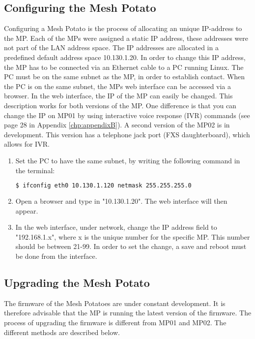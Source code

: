 \subsection{Configuring the Mesh Potato}
\label{subsec:configuring}
Configuring a Mesh Potato is the process of allocating an unique IP-address to the MP. Each of the MPs were assigned a static IP address, these addresses were not part of the LAN address space. The IP addresses are allocated in a predefined default address space 10.130.1.20. In order to change this IP address, the MP has to be connected via an Ethernet cable to a PC running Linux. The PC must be on the same subnet as the MP, in order to establish contact. When the PC is on the same subnet, the MPs web interface can be accessed via a browser. In the web interface, the IP of the MP can easily be changed. This description works for both versions of the MP. One difference is that you can change the IP on MP01 by using interactive voice response (IVR) commands (see page 28 in Appendix \ref{chp:appendixB}). A second version of the MP02 is in development. This version has a telephone jack port (FXS daughterboard), which allows for IVR. 

\begin{enumerate}
\item Set the PC to have the same subnet, by writing the following command in the terminal:
\noindent
\begin{lstlisting}[language=bash]
  $ ifconfig eth0 10.130.1.120 netmask 255.255.255.0
\end{lstlisting}
\item Open a browser and type in "10.130.1.20". The web interface will then appear. 
\item In the web interface, under network, change the IP address field to "192.168.1.x", where x is the unique number for the specific MP. This number should be between 21-99. In order to set the change, a save and reboot must be done from the interface. 
\end{enumerate}

\subsection{Upgrading the Mesh Potato}
\label{subsec:upgrading}
The firmware of the Mesh Potatoes are under constant development. It is therefore advisable that the MP is running the latest version of the firmware. The process of upgrading the firmware is different from MP01 and MP02. The different methods are described below. 

